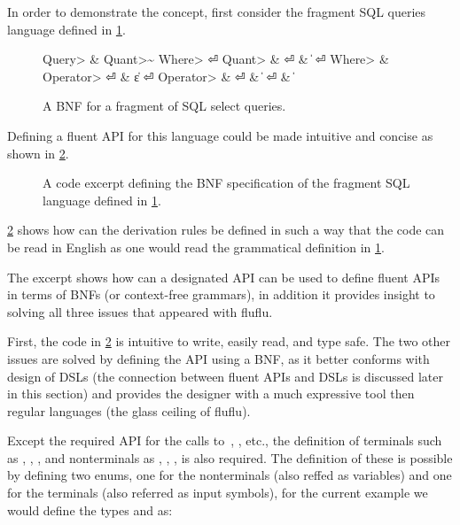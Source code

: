 In order to demonstrate the concept, first consider the fragment SQL queries
language defined in \cref{figure:sql-bnf}.

\begin{figure}[ht]
  \caption{\label{figure:sql-bnf}
    A BNF for a fragment of SQL select queries.
  }
  \begin{Grammar}
    \begin{aligned}
      \<Query> & \Derives {} \<Quant>\~ \<Where> \hfill⏎
      \<Quant> & \Derives {} \hfill⏎
               & \|  \hfill⏎
      \<Where> & \Derives {}  \<Operator> \hfill⏎
          & \|ε \hfill⏎
      \<Operator> & \Derives {}\hfill⏎
          & \|  \hfill⏎
          & \| \hfill
    \end{aligned}
  \end{Grammar}
\end{figure}

Defining a fluent API for this language could be made
intuitive and concise as shown in \cref{figure:sql-bnf-java}.

\begin{figure}[ht]
  \caption{\label{figure:sql-bnf-java}
    A \Java code excerpt defining the BNF specification of the fragment SQL
    language defined in \cref{figure:sql-bnf}.}
\end{figure}

\cref{figure:sql-bnf-java} shows how can the derivation rules be defined in
such a way that the code can be read in English as one would read the
grammatical definition in \cref{figure:sql-bnf}.

The excerpt shows how can a designated API can be used to define fluent
  APIs in terms of BNFs (or context-free grammars), in addition it provides
  insight to solving all three issues that appeared with fluflu.

First, the code in \cref{figure:sql-bnf-java} is intuitive to write, easily
read, and type safe. The two other issues are solved by defining the API using
a BNF, as it better conforms with design of DSLs (the connection between fluent
APIs and DSLs is discussed later in this section) and provides the designer
with a much expressive tool then regular languages (the glass ceiling of
fluflu).

Except the required API for the calls to~,
  ,  etc., the definition of terminals such as
  , , , and nonterminals as ,
  , , is also required.
The definition of these is possible by defining two \Java enums, one for the
nonterminals (also reffed as variables) and one for the terminals (also
referred as input symbols), for the current example we would define the types
 and  as:

